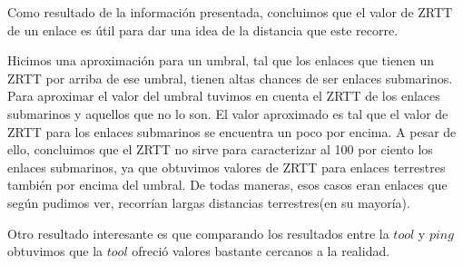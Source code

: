 Como resultado de la información presentada, concluimos que el valor de ZRTT de un enlace es útil para dar una idea de la distancia que este recorre. 

Hicimos una aproximación para un umbral, tal que los enlaces que tienen un ZRTT por arriba de ese umbral, tienen altas chances de ser enlaces submarinos. Para aproximar el valor del umbral tuvimos en cuenta el ZRTT de los enlaces submarinos y aquellos que no lo son. El valor aproximado es tal que el valor de ZRTT para los enlaces submarinos se encuentra un poco por encima. 
A pesar de ello, concluimos que el ZRTT no sirve para caracterizar al 100 por ciento los enlaces submarinos, ya que obtuvimos valores de ZRTT para enlaces terrestres también por encima del umbral. De todas maneras, esos casos eran enlaces que según pudimos ver, recorrían largas distancias terrestres(en su mayoría).

Otro resultado interesante es que comparando los resultados entre la $tool$ y $ping$ obtuvimos que la $tool$ ofreció valores bastante cercanos a la realidad.